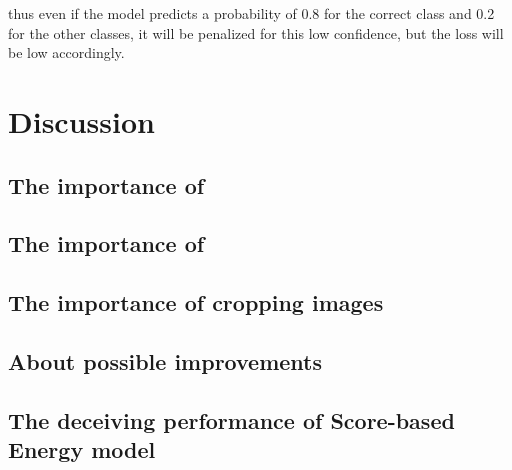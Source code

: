 \documentclass[twocolumn,superscriptaddress,aps]{revtex4-1}
\begin{document}
thus even if the model predicts a probability of 0.8 for the correct class and 0.2 for the other classes, it will be penalized for this low confidence, but the loss will be low accordingly.






\section{Discussion} %


\subsection{The importance of }


\subsection{The importance of }


\subsection{The importance of cropping images}

\subsection{About possible improvements}


\subsection{The deceiving performance of Score-based Energy model}
\end{document}
